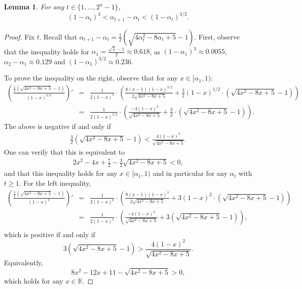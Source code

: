 \documentclass[11pt]{article}
\newtheorem{lemma}{Lemma}
\newcommand{\reals}{\mathbb{R}}
\begin{document}
\begin{lemma}\label{lem:ztBounds}
    For any $t \in \{1,\dots,2^n-1\}$,
    $$
    (1-\alpha_t)^3 < \alpha_{t+1} - \alpha_t < (1-\alpha_t)^{3/2}. 
    $$
\end{lemma}
\begin{proof}
    Fix $t$. Recall that 
    $\alpha_{t+1} - \alpha_t = \frac{1}{2}(\sqrt{4\alpha_t^2 - 8\alpha_t +5} - 1)$.
    First, observe that the inequality holds for $\alpha_1 = \frac{\sqrt{5}-1}{2} \approx 0.618$, as $(1-\alpha_1)^{3} \approx 0.0055$, $\alpha_2 - \alpha_1 \approx 0.129$ and $(1-\alpha_1)^{3/2} \approx 0.236$.

    To prove the inequality on the right, observe that for any $x \in [\alpha_1,1)$:
    \begin{eqnarray*}
        \left(\frac{\frac{1}{2}(\sqrt{4x^2 - 8x +5} - 1)}{(1-x)^{3/2}}\right)'
        &=&
        \frac{1}{2(1-x)^3}\cdot \left(\frac{8(x-1)(1-x)^{3/2}}{2\sqrt{4x^2-8x+5}} + \frac{3}{2}(1-x)^{1/2}\cdot(\sqrt{4x^2-8x+5}-1)\right) \\
        &=&
        \frac{1}{2(1-x)^{5/2}}\cdot \left(\frac{-4(1-x)^2}{\sqrt{4x^2-8x+5}} + \frac{3}{2}\cdot(\sqrt{4x^2-8x+5}-1)\right).
    \end{eqnarray*}
    The above is negative if and only if
    \begin{eqnarray*}
        \frac{3}{2}(\sqrt{4x^2-8x+5}-1) < \frac{4(1-x)^{2}}{\sqrt{4x^2-8x+5}}.
    \end{eqnarray*}
    One can verify that this is equivalent to
    \begin{eqnarray*}
        2x^2 - 4x + \frac{7}{2} - \frac{3}{2}\sqrt{4x^2-8x+5} < 0,
    \end{eqnarray*}
    and that this inequality holds for any $x \in [\alpha_1,1)$ and in particular for any $\alpha_t$ with $t \ge 1$. 
    For the left inequality,  
    \begin{eqnarray*}
        \left(\frac{\frac{1}{2}(\sqrt{4x^2 - 8x +5} - 1)}{(1-x)^{3}}\right)'
        &=&
        \frac{1}{2(1-x)^6}\cdot \left(\frac{8(x-1)(1-x)^{3}}{2\sqrt{4x^2-8x+5}} +3(1-x)^2\cdot(\sqrt{4x^2-8x+5}-1)\right) \\
        &=&
        \frac{1}{2(1-x)^4}\cdot \left(\frac{-4(1-x)^{2}}{\sqrt{4x^2-8x+5}} + 3(\sqrt{4x^2-8x+5}-1)\right), \\
    \end{eqnarray*}
    which is positive if and only if
    $$
    3(\sqrt{4x^2-8x+5}-1) > \frac{4(1-x)^{2}}{\sqrt{4x^2-8x+5}}.
    $$
    Equivalently,
    $$
    8x^2-12x+11-\sqrt{4x^2-8x+5} > 0,
    $$
    which holds for any $x \in \reals$.
\end{proof}
\end{document}
